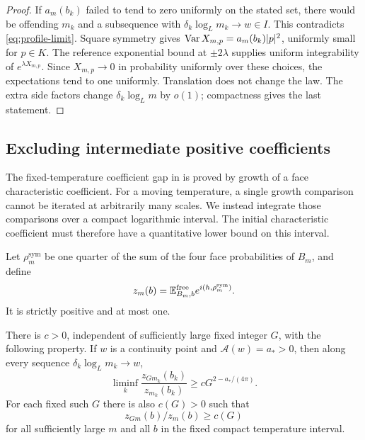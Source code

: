 \begin{proof}
If $a_m(b_k)$ failed to tend to zero uniformly on the stated set,
there would be offending $m_k$ and a subsequence with
$\delta_k\log_Lm_k\to w\in I$. This contradicts
\eqref{eq:profile-limit}. Square symmetry gives
$\operatorname{Var} X_{m,p}=a_m(b_k)|p|^2$, uniformly small for $p\in K$.
The reference exponential bound at $\pm2\lambda$ supplies uniform
integrability of $e^{\lambda X_{m,p}}$. Since $X_{m,p}\to0$ in
probability uniformly over these choices, the expectations tend to
one uniformly. Translation does not change the law. The extra side
factors change $\delta_k\log_Lm$ by $o(1)$; compactness gives the
last statement.
\end{proof}

\subsection{Excluding intermediate positive coefficients}

The fixed-temperature coefficient gap in \cite[Theorem~2.5]{X}
is proved by growth
of a face characteristic coefficient. For a moving temperature, a
single growth comparison cannot be iterated at arbitrarily many
scales. We instead integrate those comparisons over a compact
logarithmic interval. The initial characteristic coefficient must
therefore have a quantitative lower bound on this interval.

Let $\rho_m^{\mathrm{sym}}$ be one quarter of the sum of the four
face probabilities of $B_m$, and define
\begin{equation}\label{eq:profile-z}
 z_m(b)=\mathbb E_{B_m,b}^{\mathrm{free}}
                           e^{i(h,\rho_m^{\mathrm{sym}})}.
\end{equation}
It is strictly positive and at most one.

\begin{lemma}\label{lem:profile-ratio}
There is $c>0$, independent of sufficiently large fixed integer $G$,
with the following property. If $w$ is a continuity point and
$\mathcal A(w)=a_*>0$, then along every sequence
$\delta_k\log_Lm_k\to w$,
\begin{equation}\label{eq:profile-ratio}
 \liminf_k\frac{z_{Gm_k}(b_k)}{z_{m_k}(b_k)}
                          \ge cG^{2-a_* /(4\pi)}.
\end{equation}
For each fixed such $G$ there is also $c(G)>0$ such that
\begin{equation}\label{eq:profile-ratio-rough}
                     z_{Gm}(b)/z_m(b)\ge c(G)
\end{equation}
for all sufficiently large $m$ and all $b$ in the fixed compact
temperature interval.
\end{lemma}

